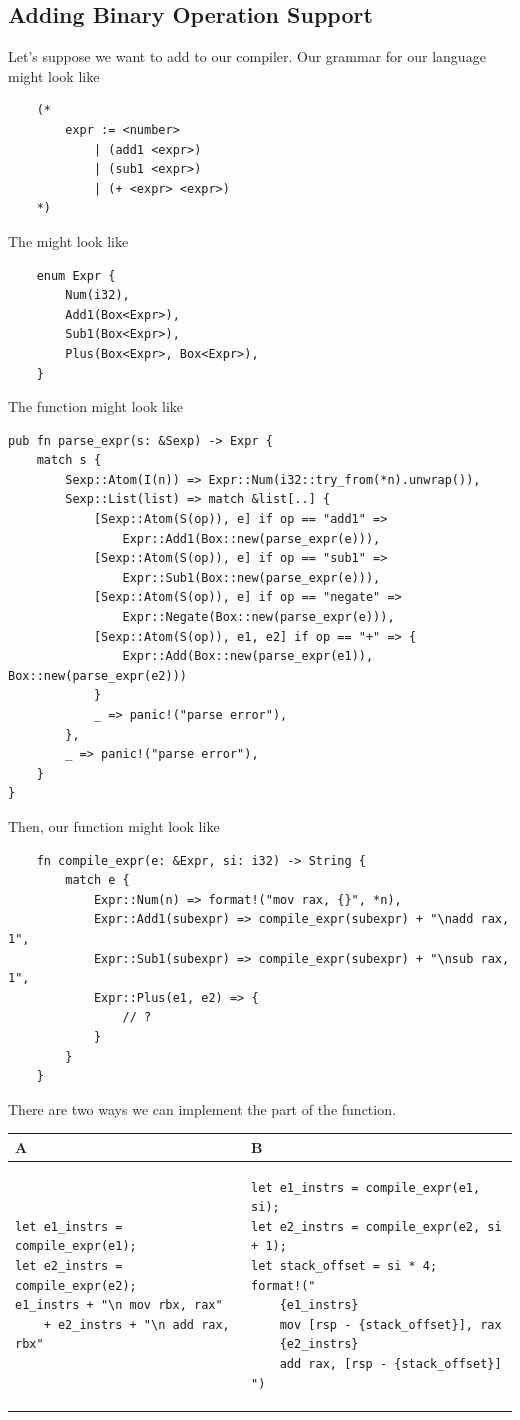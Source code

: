\documentclass[letterpaper]{article}
\begin{document}
\subsection{Adding Binary Operation Support}
Let's suppose we want to add  to our compiler. Our grammar for our language might look like 
\begin{verbatim}
    (*
        expr := <number> 
            | (add1 <expr>)
            | (sub1 <expr>)
            | (+ <expr> <expr>) 
    *)\end{verbatim}
The   might look like 
\begin{verbatim}
    enum Expr {
        Num(i32),
        Add1(Box<Expr>),
        Sub1(Box<Expr>),
        Plus(Box<Expr>, Box<Expr>),
    }\end{verbatim} 
The  function might look like 
\begin{verbatim}
pub fn parse_expr(s: &Sexp) -> Expr {
    match s {
        Sexp::Atom(I(n)) => Expr::Num(i32::try_from(*n).unwrap()),
        Sexp::List(list) => match &list[..] {
            [Sexp::Atom(S(op)), e] if op == "add1" => 
                Expr::Add1(Box::new(parse_expr(e))),
            [Sexp::Atom(S(op)), e] if op == "sub1" => 
                Expr::Sub1(Box::new(parse_expr(e))),
            [Sexp::Atom(S(op)), e] if op == "negate" => 
                Expr::Negate(Box::new(parse_expr(e))),
            [Sexp::Atom(S(op)), e1, e2] if op == "+" => {
                Expr::Add(Box::new(parse_expr(e1)), Box::new(parse_expr(e2)))
            }
            _ => panic!("parse error"),
        },
        _ => panic!("parse error"),
    }
}\end{verbatim}
Then, our  function might look like 
\begin{verbatim}
    fn compile_expr(e: &Expr, si: i32) -> String {
        match e {
            Expr::Num(n) => format!("mov rax, {}", *n),
            Expr::Add1(subexpr) => compile_expr(subexpr) + "\nadd rax, 1",
            Expr::Sub1(subexpr) => compile_expr(subexpr) + "\nsub rax, 1",
            Expr::Plus(e1, e2) => {
                // ?
            }
        }
    }\end{verbatim}

There are two ways we can implement the  part of the function. 
\begin{center}
    \begin{tabular}{p{3in} | p{3in}}
        A & B \\ 
        \hline 
        \begin{verbatim}
let e1_instrs = compile_expr(e1);
let e2_instrs = compile_expr(e2);
e1_instrs + "\n mov rbx, rax"
    + e2_instrs + "\n add rax, rbx"\end{verbatim}
        & 
        \begin{verbatim}
let e1_instrs = compile_expr(e1, si);
let e2_instrs = compile_expr(e2, si + 1);
let stack_offset = si * 4;
format!("
    {e1_instrs}
    mov [rsp - {stack_offset}], rax
    {e2_instrs}
    add rax, [rsp - {stack_offset}]
")\end{verbatim}
    \end{tabular}
\end{center}
\end{document}
